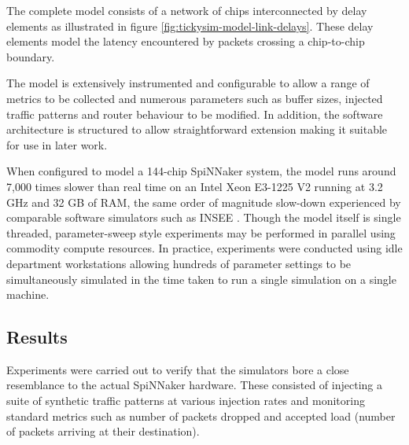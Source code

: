			The complete model consists of a network of chips interconnected by delay
			elements as illustrated in figure \ref{fig:tickysim-model-link-delays}.
			These delay elements model the latency encountered by packets crossing a
			chip-to-chip boundary.
			
			The model is extensively instrumented and configurable to allow a range of
			metrics to be collected and numerous parameters such as buffer sizes,
			injected traffic patterns and router behaviour to be modified. In
			addition, the software architecture is structured to allow straightforward
			extension making it suitable for use in later work.
			
			When configured to model a 144-chip SpiNNaker system, the model runs
			around 7,000 times slower than real time on an Intel Xeon E3-1225 V2
			running at 3.2 GHz and 32 GB of RAM, the same order of magnitude slow-down
			experienced by comparable software simulators such as INSEE
			\cite{navaridas11insee}. Though the model itself is single threaded,
			parameter-sweep style experiments may be performed in parallel using
			commodity compute resources. In practice, experiments were conducted using
			idle department workstations allowing hundreds of parameter settings to be
			simultaneously simulated in the time taken to run a single simulation on a
			single machine.
		
		\subsection{Results}
			
			
			Experiments were carried out to verify that the simulators bore a close
			resemblance to the actual SpiNNaker hardware. These consisted of injecting
			a suite of synthetic traffic patterns at various injection rates and
			monitoring standard metrics such as number of packets dropped and accepted
			load (number of packets arriving at their destination).
			
